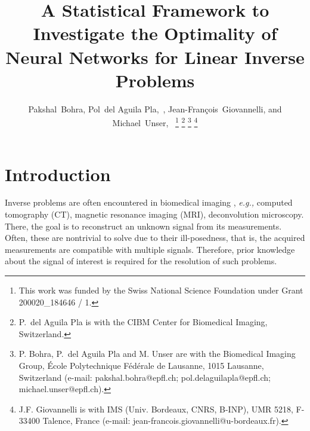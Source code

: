 \documentclass[journal]{IEEEtran}
\begin{document}
\IEEEoverridecommandlockouts


\title{A Statistical Framework to Investigate the Optimality of Neural Networks for Linear Inverse Problems}

\author{Pakshal~Bohra, Pol~{del Aguila Pla},~,
Jean-Fran\c{c}ois~Giovannelli, and Michael~Unser,~
\thanks{This work was funded by the Swiss National Science Foundation under
Grant 200020\_184646 / 1.}
\thanks{P.~{del Aguila Pla} is with the CIBM Center for Biomedical Imaging,
Switzerland.}
\thanks{P. Bohra, P.~{del Aguila Pla} and M. Unser are with the Biomedical
Imaging Group, \'{E}cole Polytechnique F\'{e}d\'{e}rale de Lausanne, 1015
Lausanne, Switzerland (e-mail: pakshal.bohra@epfl.ch;
pol.delaguilapla@epfl.ch; michael.unser@epfl.ch).}
\thanks{J.F. Giovannelli is with IMS (Univ. Bordeaux, CNRS, B-INP), UMR 5218,
F-33400 Talence, France (e-mail: jean-francois.giovannelli@u-bordeaux.fr).
}}%








\maketitle

\begin{abstract}
    
\end{abstract}
\begin{IEEEkeywords}
    
\end{IEEEkeywords}



\section{Introduction}\label{sec:intro}
Inverse problems are often encountered in biomedical imaging \cite{unser2019biomedical}, \textit{e.g.,} computed tomography (CT), magnetic resonance imaging (MRI), deconvolution microscopy. There, the goal is to reconstruct an unknown signal from its measurements. Often, these are nontrivial to solve due to their ill-posedness, that is, the acquired measurements are compatible with multiple signals. Therefore, prior knowledge about the signal of interest is required for the resolution of such problems.   
\end{document}
